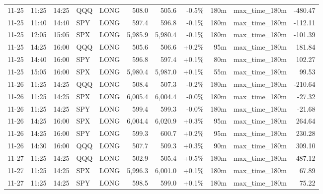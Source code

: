 \documentclass[11pt,a4paper,twoside]{article}
\begin{document}
\begin{center}
\begin{longtable}{>{\color{txtmain}}l l l l l r r r r >{\color{txtmain}}l r}
11-25 & 11:25 & 14:25 & QQQ & LONG & 508.0 & 505.6 & \textcolor{lossred}{-0.5\%} & 180m & max\_time\_180m & \textcolor{lossred}{-480.47} \\
11-25 & 11:40 & 14:40 & SPY & LONG & 597.4 & 596.8 & \textcolor{lossred}{-0.1\%} & 180m & max\_time\_180m & \textcolor{lossred}{-112.11} \\
11-25 & 12:05 & 15:05 & SPX & LONG & 5,985.9 & 5,980.4 & \textcolor{lossred}{-0.1\%} & 180m & max\_time\_180m & \textcolor{lossred}{-101.39} \\
11-25 & 14:25 & 16:00 & QQQ & LONG & 505.6 & 506.6 & \textcolor{wingreen}{+0.2\%} & 95m & max\_time\_180m & \textcolor{wingreen}{181.84} \\
11-25 & 14:40 & 16:00 & SPY & LONG & 596.8 & 597.4 & \textcolor{wingreen}{+0.1\%} & 80m & max\_time\_180m & \textcolor{wingreen}{102.27} \\
11-25 & 15:05 & 16:00 & SPX & LONG & 5,980.4 & 5,987.0 & \textcolor{wingreen}{+0.1\%} & 55m & max\_time\_180m & \textcolor{wingreen}{99.53} \\
11-26 & 11:25 & 14:25 & QQQ & LONG & 508.4 & 507.3 & \textcolor{lossred}{-0.2\%} & 180m & max\_time\_180m & \textcolor{lossred}{-210.64} \\
11-26 & 11:25 & 14:25 & SPX & LONG & 6,005.4 & 6,004.4 & \textcolor{lossred}{-0.0\%} & 180m & max\_time\_180m & \textcolor{lossred}{-27.32} \\
11-26 & 11:25 & 14:25 & SPY & LONG & 599.4 & 599.3 & \textcolor{lossred}{-0.0\%} & 180m & max\_time\_180m & \textcolor{lossred}{-21.68} \\
11-26 & 14:25 & 16:00 & SPX & LONG & 6,004.4 & 6,020.9 & \textcolor{wingreen}{+0.3\%} & 95m & max\_time\_180m & \textcolor{wingreen}{264.64} \\
11-26 & 14:25 & 16:00 & SPY & LONG & 599.3 & 600.7 & \textcolor{wingreen}{+0.2\%} & 95m & max\_time\_180m & \textcolor{wingreen}{230.28} \\
11-26 & 14:30 & 16:00 & QQQ & LONG & 507.7 & 509.3 & \textcolor{wingreen}{+0.3\%} & 90m & max\_time\_180m & \textcolor{wingreen}{309.10} \\
11-27 & 11:25 & 14:25 & QQQ & LONG & 502.9 & 505.4 & \textcolor{wingreen}{+0.5\%} & 180m & max\_time\_180m & \textcolor{wingreen}{487.12} \\
11-27 & 11:25 & 14:25 & SPX & LONG & 5,996.3 & 6,001.0 & \textcolor{wingreen}{+0.1\%} & 180m & max\_time\_180m & \textcolor{wingreen}{67.89} \\
11-27 & 11:25 & 14:25 & SPY & LONG & 598.5 & 599.0 & \textcolor{wingreen}{+0.1\%} & 180m & max\_time\_180m & \textcolor{wingreen}{75.22} \\

\end{longtable}
\end{center}
\end{document}
